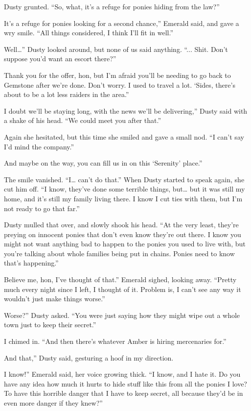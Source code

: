 Dusty grunted. “So, what, it’s a refuge for ponies hiding from the law?”

\leavevmode{}It’s a refuge for ponies looking for a second chance,” Emerald said, and gave a wry smile. “All things considered, I think I’ll fit in well.”

\leavevmode{}Well…” Dusty looked around, but none of us said anything. “... Shit. Don’t suppose you’d want an escort there?”

\leavevmode{}Thank you for the offer, hon, but I’m afraid you’ll be needing to go back to Gemstone after we’re done. Don’t worry. I used to travel a lot. ‘Sides, there’s about to be a lot less raiders in the area.”

\leavevmode{}I doubt we’ll be staying long, with the news we’ll be delivering,” Dusty said with a shake of his head. “We could meet you after that.”

Again she hesitated, but this time she smiled and gave a small nod. “I can’t say I’d mind the company.”

\leavevmode{}And maybe on the way, you can fill us in on this ‘Serenity’ place.”

The smile vanished. “I… can’t do that.” When Dusty started to speak again, she cut him off. “I know, they’ve done some terrible things, but… but it was still my home, and it’s still my family living there. I know I cut ties with them, but I’m not ready to go that far.”

Dusty mulled that over, and slowly shook his head. “At the very least, they’re preying on innocent ponies that don’t even know they’re out there. I know you might not want anything bad to happen to the ponies you used to live with, but you’re talking about whole families being put in chains. Ponies need to know that’s happening.”

\leavevmode{}Believe me, hon, I’ve thought of that.” Emerald sighed, looking away. “Pretty much every night since I left, I thought of it. Problem is, I can’t see any way it wouldn’t just make things worse.”

\leavevmode{}Worse?” Dusty asked. “You were just saying how they might wipe out a whole town just to keep their secret.”

I chimed in. “And then there’s whatever Amber is hiring mercenaries for.”

\leavevmode{}And that,” Dusty said, gesturing a hoof in my direction.

\leavevmode{}I know!” Emerald said, her voice growing thick. “I know, and I hate it. Do you have any idea how much it hurts to hide stuff like this from all the ponies I love? To have this horrible danger that I have to keep secret, all because they’d be in even more danger if they knew?”

